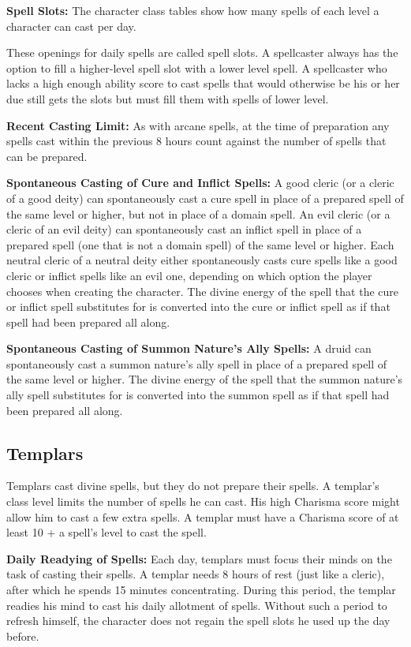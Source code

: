 \textbf{Spell Slots:} The character class tables show how many spells of each level a character can cast per day.

These openings for daily spells are called spell slots. A spellcaster always has the option to fill a higher-level spell slot with a lower level spell. A spellcaster who lacks a high enough ability score to cast spells that would otherwise be his or her due still gets the slots but must fill them with spells of lower level.

\textbf{Recent Casting Limit:} As with arcane spells, at the time of preparation any spells cast within the previous 8 hours count against the number of spells that can be prepared.

\textbf{Spontaneous Casting of Cure and Inflict Spells:} A good cleric (or a cleric of a good deity) can spontaneously cast a cure spell in place of a prepared spell of the same level or higher, but not in place of a domain spell. An evil cleric (or a cleric of an evil deity) can spontaneously cast an inflict spell in place of a prepared spell (one that is not a domain spell) of the same level or higher. Each neutral cleric of a neutral deity either spontaneously casts cure spells like a good cleric or inflict spells like an evil one, depending on which option the player chooses when creating the character. The divine energy of the spell that the cure or inflict spell substitutes for is converted into the cure or inflict spell as if that spell had been prepared all along.

\textbf{Spontaneous Casting of Summon Nature's Ally Spells:} A druid can spontaneously cast a summon nature's ally spell in place of a prepared spell of the same level or higher. The divine energy of the spell that the summon nature's ally spell substitutes for is converted into the summon spell as if that spell had been prepared all along.

\subsection{Templars}
Templars cast divine spells, but they do not prepare their spells. A templar's class level limits the number of spells he can cast. His high Charisma score might allow him to cast a few extra spells. A templar must have a Charisma score of at least 10 + a spell's level to cast the spell.

\textbf{Daily Readying of Spells:} Each day, templars must focus their minds on the task of casting their spells. A templar needs 8 hours of rest (just like a cleric), after which he spends 15 minutes concentrating. During this period, the templar readies his mind to cast his daily allotment of spells. Without such a period to refresh himself, the character does not regain the spell slots he used up the day before.

